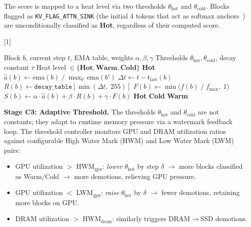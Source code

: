 \documentclass[conference]{IEEEtran}
\begin{document}
The score is mapped to a heat level via two thresholds $\theta_{\text{hot}}$ and $\theta_{\text{cold}}$. Blocks flagged as \texttt{KV\_FLAG\_ATTN\_SINK} (the initial 4 tokens that act as softmax anchors~\cite{streamingllm}) are unconditionally classified as \textbf{Hot}, regardless of their computed score.

\begin{algorithm}[t]
\caption{Per-Block Hot-Cold Classification (C1+C2)}
\label{alg:classify}
\algrenewcommand{\alglinenumber}[1]{}
\begin{algorithmic}
\Require Block $b$, current step $t$, EMA table, weights $\alpha, \beta, \gamma$
\Require Thresholds $\theta_{\text{hot}}, \theta_{\text{cold}}$, decay constant $\tau$
\Ensure Heat level $\in \{\textbf{Hot}, \textbf{Warm}, \textbf{Cold}\}$
\Statex
{} 
    \State \Return \textbf{Hot}
\EndIf
\Statex
\State $\hat{a}(b) \gets \text{ema}(b) \;/\; \max_{b'} \text{ema}(b')$ 
\State $\Delta t \gets t - t_{\text{last}}(b)$ 
\State $R(b) \gets \texttt{decay\_table}[\min(\Delta t,\; 255)]$ 
\State $F(b) \gets \min\bigl(f(b) \;/\; f_{\max},\; 1\bigr)$ 
\Statex
\State $S(b) \gets \alpha \cdot \hat{a}(b) + \beta \cdot R(b) + \gamma \cdot F(b)$ 
\Statex
{}
    \State \Return \textbf{Hot} 
    \State \Return \textbf{Cold} 
\Else
    \State \Return \textbf{Warm} 
\EndIf
\end{algorithmic}
\end{algorithm}

\textbf{Stage C3: Adaptive Threshold.} The thresholds $\theta_{\text{hot}}$ and $\theta_{\text{cold}}$ are not constants; they adapt to runtime memory pressure via a watermark feedback loop. The threshold controller monitors GPU and DRAM utilization ratios against configurable High Water Mark (HWM) and Low Water Mark (LWM) pairs:

\begin{itemize}
\item GPU utilization $>$ HWM$_{\text{gpu}}$: \emph{lower} $\theta_{\text{hot}}$ by step $\delta$ $\to$ more blocks classified as Warm/Cold $\to$ more demotions, relieving GPU pressure.
\item GPU utilization $<$ LWM$_{\text{gpu}}$: \emph{raise} $\theta_{\text{hot}}$ by $\delta$ $\to$ fewer demotions, retaining more blocks on GPU.
\item DRAM utilization $>$ HWM$_{\text{dram}}$: similarly triggers DRAM$\to$SSD demotions.
\end{itemize}
\end{document}
